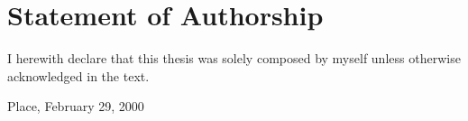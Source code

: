 

\cleardoublepage
\nocite{*}
\printbibliography[title = {References}]

\chapter*{Statement of Authorship}
I herewith declare that this thesis was solely composed by myself unless otherwise acknowledged in the text.\\

\vspace{1cm}

Place, February 29, 2000 \hfill\makebox[5.2cm]{\hrulefill}%
\vspace{-\parskip}\par\noindent%
\hfill{}

